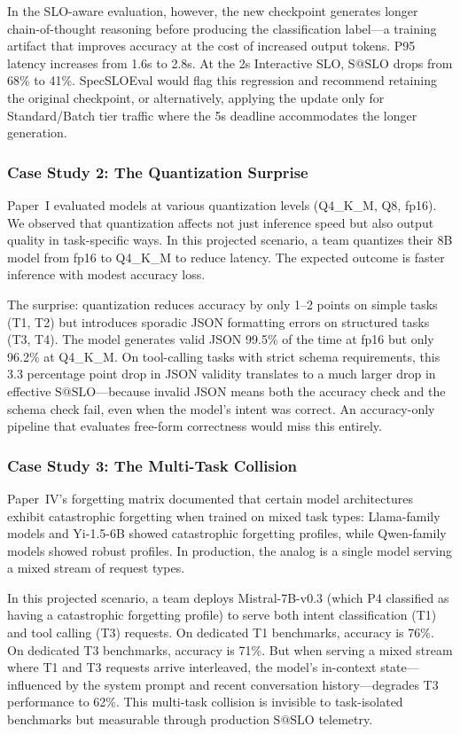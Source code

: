 \documentclass[11pt]{article}
\makeatletter
\newcommand{\sslo}{\ensuremath{\mathrm{S@SLO}}}
\makeatother
\begin{document}
In the SLO-aware evaluation, however, the new checkpoint generates longer chain-of-thought reasoning before producing the classification label---a training artifact that improves accuracy at the cost of increased output tokens. P95 latency increases from 1.6s to 2.8s. At the 2s Interactive SLO, $\sslo{}$ drops from 68\% to 41\%. SpecSLOEval would flag this regression and recommend retaining the original checkpoint, or alternatively, applying the update only for Standard/Batch tier traffic where the 5s deadline accommodates the longer generation.

\subsubsection{Case Study 2: The Quantization Surprise}

Paper~I evaluated models at various quantization levels (Q4\_K\_M, Q8, fp16). We observed that quantization affects not just inference speed but also output quality in task-specific ways. In this projected scenario, a team quantizes their 8B model from fp16 to Q4\_K\_M to reduce latency. The expected outcome is faster inference with modest accuracy loss.

The surprise: quantization reduces accuracy by only 1--2 points on simple tasks (T1, T2) but introduces sporadic JSON formatting errors on structured tasks (T3, T4). The model generates valid JSON 99.5\% of the time at fp16 but only 96.2\% at Q4\_K\_M. On tool-calling tasks with strict schema requirements, this 3.3 percentage point drop in JSON validity translates to a much larger drop in effective $\sslo{}$---because invalid JSON means both the accuracy check and the schema check fail, even when the model's intent was correct. An accuracy-only pipeline that evaluates free-form correctness would miss this entirely.

\subsubsection{Case Study 3: The Multi-Task Collision}

Paper~IV's forgetting matrix documented that certain model architectures exhibit catastrophic forgetting when trained on mixed task types: Llama-family models and Yi-1.5-6B showed catastrophic forgetting profiles, while Qwen-family models showed robust profiles. In production, the analog is a single model serving a mixed stream of request types.

In this projected scenario, a team deploys Mistral-7B-v0.3 (which P4 classified as having a catastrophic forgetting profile) to serve both intent classification (T1) and tool calling (T3) requests. On dedicated T1 benchmarks, accuracy is 76\%. On dedicated T3 benchmarks, accuracy is 71\%. But when serving a mixed stream where T1 and T3 requests arrive interleaved, the model's in-context state---influenced by the system prompt and recent conversation history---degrades T3 performance to 62\%. This multi-task collision is invisible to task-isolated benchmarks but measurable through production $\sslo{}$ telemetry.
\end{document}
